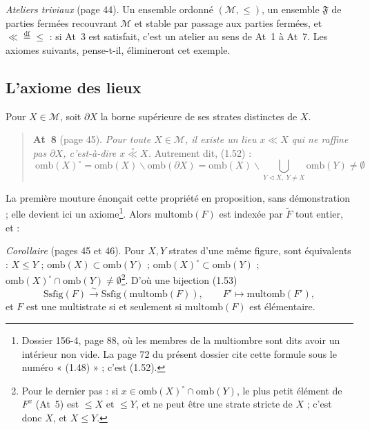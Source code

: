 \documentclass[11pt,a4paper]{article}
\begin{document}
\emph{Ateliers triviaux} (page 44). Un ensemble ordonné $(\mathcal{M}, \leq)$, un
ensemble $\mathfrak{F}$ de parties fermées recouvrant $\mathcal{M}$ et stable par
passage aux parties fermées, et $\ll \overset{\mathrm{df}}{=} \leq$ : si At~3 est
satisfait, c'est un atelier au sens de At~1 à At~7. Les axiomes suivants,
pense-t-il, élimineront cet exemple.

\subsection*{L'axiome des lieux}

Pour $X \in \mathcal{M}$, soit $\partial X$ la borne supérieure de ses strates
distinctes de $X$.

\begin{quote}
\textbf{At~8} (page 45). \emph{Pour toute $X \in \mathcal{M}$, il existe un lieu
$x \ll X$ qui ne raffine pas $\partial X$, c'est-à-dire $x
\mathrel{\overset{\circ}{\ll}} X$.} Autrement dit, (1.52) :
\[
\boxed{\ \mathrm{omb}(X)^{\circ} = \mathrm{omb}(X) \smallsetminus
\mathrm{omb}(\partial X) = \mathrm{omb}(X) \smallsetminus \bigcup_{Y
\mathrel{\triangleleft} X,\ Y \neq X} \mathrm{omb}(Y) \neq \emptyset\ }
\]
\end{quote}

La première mouture énonçait cette propriété en proposition, sans démonstration ;
elle devient ici un axiome\footnote{Dossier 156-4, page 88, où les membres de la
multiombre sont dits avoir un intérieur non vide. La page 72 du présent dossier
cite cette formule sous le numéro « (1.48) » ; c'est (1.52).}. Alors
$\mathrm{multomb}(F)$ est indexée par $\widetilde{F}$ tout entier, et :

\emph{Corollaire} (pages 45 et 46). Pour $X, Y$ strates d'une même figure, sont
équivalents : $X \leq Y$ ; $\mathrm{omb}(X) \subset \mathrm{omb}(Y)$ ;
$\mathrm{omb}(X)^{\circ} \subset \mathrm{omb}(Y)$ ; $\mathrm{omb}(X)^{\circ} \cap
\mathrm{omb}(Y) \neq \emptyset$\footnote{Pour le dernier pas : si $x \in
\mathrm{omb}(X)^{\circ} \cap \mathrm{omb}(Y)$, le plus petit élément de
$F^{x}$ (At~5) est $\leq X$ et $\leq Y$, et ne peut être une strate stricte de
$X$ ; c'est donc $X$, et $X \leq Y$.}. D'où une bijection (1.53)
\[
\mathrm{Ssfig}(F) \xrightarrow{\ \sim\ } \mathrm{Ssfig}(\mathrm{multomb}(F)), \qquad
F' \longmapsto \mathrm{multomb}(F'),
\]
et $F$ est une multistrate si et seulement si $\mathrm{multomb}(F)$ est
élémentaire.
\end{document}
